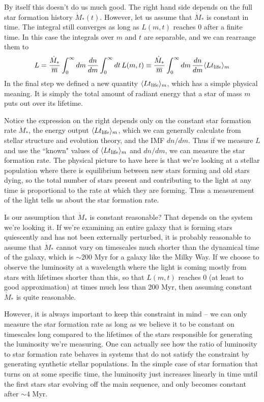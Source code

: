 By itself this doesn't do us much good. The right hand side depends on the full star formation history $\dot{M}_*(t)$. However, let us assume that $\dot{M}_*$ is constant in time. The integral still converges as long as $L(m,t)$ reaches 0 after a finite time. In this case the integrals over $m$ and $t$ are separable, and we can rearrange them to
\begin{equation}
\label{eq:sfrtol}
L = \frac{\dot{M}_*}{\overline{m}} \int_0^{\infty} dm \, \frac{dn}{dm} \int_0^\infty dt \, L(m,t) \equiv \frac{\dot{M}_*}{\overline{m}} \int_0^{\infty} dm \, \frac{dn}{dm} \langle L t_{\rm life} \rangle_m 
\end{equation}
In the final step we defined a new quantity $\langle L t_{\rm life} \rangle_m$, which has a simple physical meaning. It is simply the total amount of radiant energy that a star of mass $m$ puts out over its lifetime.

Notice the expression on the right depends only on the constant star formation rate $\dot{M}_*$, the energy output $\langle L t_{\rm life}\rangle_m$, which we can generally calculate from stellar structure and evolution theory, and the IMF $dn/dm$. Thus if we measure $L$ and use the ``known" values of  $\langle L t_{\rm life}\rangle_m$ and $dn/dm$, we can measure the star formation rate. The physical picture to have here is that we're looking at a stellar population where there is equilibrium between new stars forming and old stars dying, so the total number of stars present and contributing to the light at any time is proportional to the rate at which they are forming. Thus a measurement of the light tells us about the star formation rate.

Is our assumption that $\dot{M}_*$ is constant reasonable? That depends on the system we're looking it. If we're examining an entire galaxy that is forming stars quiescently and has not been externally perturbed, it is probably reasonable to assume that $\dot{M}_*$ cannot vary on timescales much shorter than the dynamical time of the galaxy, which is $\sim 200$ Myr for a galaxy like the Milky Way. If we choose to observe the luminosity at a wavelength where the light is coming mostly from stars with lifetimes shorter than this, so that $L(m,t)$ reaches 0 (at least to good approximation) at times much less than 200 Myr, then assuming constant $\dot{M}_*$ is quite reasonable.

However, it is always important to keep this constraint in mind -- we can only measure the star formation rate as long as we believe it to be constant on timescales long compared to the lifetimes of the stars responsible for generating the luminosity we're measuring. One can actually see how the ratio of luminosity to star formation rate behaves in systems that do not satisfy the constraint by generating synthetic stellar populations. In the simple case of star formation that turns on at some specific time, the luminosity just increases linearly in time until the first stars star evolving off the main sequence, and only becomes constant after $\sim 4$ Myr.

